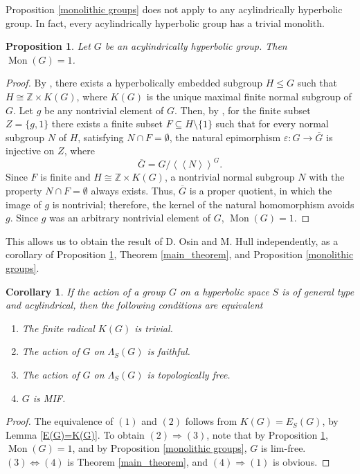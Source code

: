 \documentclass[11pt,letterpaper]{article}
\newcommand{\ZZ}{\mathbb{Z}}
\DeclareMathOperator{\Mon}{Mon}
\newtheorem{cor}[thm]{Corollary}
\newtheorem{prop}[thm]{Proposition}
\theoremstyle{definition}
\theoremstyle{remark}
\begin{document}
Proposition \ref{monolithic groups} does not apply to any acylindrically hyperbolic group. In fact, every acylindrically hyperbolic group has a trivial monolith.

\begin{prop}\label{monolith is trivial}
Let $G$ be an acylindrically hyperbolic group. Then $\Mon(G)=1$.
\end{prop}

\begin{proof}
By \cite[Thm 2.24 (c)]{DGO}, there exists a hyperbolically embedded subgroup $H \leq G$ such that $H \cong \ZZ \times K(G)$, where $K(G)$ is the unique maximal finite normal subgroup of $G$. Let $g$ be any nontrivial element of $G$. Then, by \cite[Thm 7.19]{DGO}, for the finite subset $Z=\{g,1\}$  there exists a finite subset $F \subseteq H \setminus \{1\}$ such that for every normal subgroup $N$ of $H$, satisfying $N \cap F =\emptyset$, the natural epimorphism $\varepsilon: G \rightarrow \overline{G}$ is injective on $Z$, where 
$$
\overline{G}=G /\left\langle\left\langle N\right\rangle\right\rangle^G.
$$
Since $F$ is finite and $H \cong \ZZ \times K(G)$, a nontrivial normal subgroup $N$ with the property $N \cap F =\emptyset$ always exists. Thus, $\overline{G}$ is a proper quotient, in which the image of $g$ is nontrivial; therefore, the kernel of the natural homomorphism avoids $g$. Since $g$ was an arbitrary nontrivial element of $G$,  $\Mon(G)=1$.
\end{proof}

This allows us to obtain the result of D. Osin and M. Hull  \cite[Cor. 5.10]{OH} independently, as a corollary of Proposition \ref{monolith is trivial}, Theorem \ref{main_theorem}, and Proposition \ref{monolithic groups}.

\begin{cor}\label{acylindrically hyperbolic groups are lim-free}
If the action of a group $G$ on a hyperbolic space $S$ is of general type and acylindrical, then the following conditions are equivalent
\begin{enumerate}
    \item The finite radical $K(G)$ is trivial.
    \item The action of $G$ on $\Lambda_S(G)$ is faithful.
    \item The action of $G$ on $\Lambda_S(G)$ is topologically free.
    \item $G$ is MIF.
\end{enumerate}
\end{cor}
\begin{proof}
The equivalence of $(1)$ and $(2)$ follows from $K(G)=E_S(G)$, by Lemma \ref{E(G)=K(G)}.
To obtain $(2) \Longrightarrow (3)$, note that by Proposition \ref{monolith is trivial}, $\Mon(G)=1$, and by Proposition \ref{monolithic groups}, $G$ is lim-free.
$(3) \Longleftrightarrow (4)$ is Theorem \ref{main_theorem}, and $(4) \Rightarrow (1)$ is obvious.
\end{proof}
\end{document}
